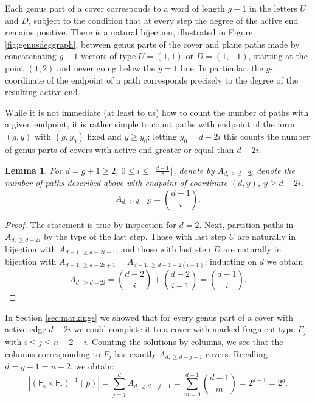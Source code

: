 \documentclass[11pt,reqno]{amsart}
\newtheorem{lemma}[theorem]{Lemma}
\theoremstyle{definition}
\newcommand{\Ft}{\mathsf{F_t}}
\newcommand{\Fs}{\mathsf{F_s}}
\begin{document}
Each genus part of a cover corresponds to a  word of length $g-1$ in the letters $U$ and $D$, subject to the condition that at every step the degree of the active end remains positive. There is a natural bijection, illustrated in Figure \ref{fig:genusdeggraph}, between genus parts of the cover and plane paths made by concatenating $g-1$ vectors of type $U = (1,1)$ or $D = (1,-1)$, starting at the point $(1,2)$ and never going below the $y=1$ line. In particular, the $y$-coordinate of the endpoint of a path corresponds precisely to the degree of the resulting active end.

While it is not immediate (at least to us) how to count the number of paths with a given endpoint, it is rather simple to count paths  with endpoint of the form $(g, y)$ with $(g,y_0)$ fixed and $y\geq y_0$; letting $y_0 = d-2i$ this counts the number of genus parts of covers with active end greater or equal than $d-2i$.


\begin{lemma} \label{lemma:deg active}
For $d = g+1 \geq 2$, $0\leq i\leq \lfloor\frac{d-1}{2}\rfloor$, denote by $A_{d, \geq d-2i}$ denote the number of paths described above with endpoint of coordinate $(d, y)$, $y\geq d-2i$. 
\begin{equation}
  A_{d,\geq d-2i}%
  = {{d-1}\choose{i}}.
\end{equation}
\end{lemma}
\begin{proof}
    The statement is true by inspection for $d=2$. Next, partition paths in $A_{d,\geq d-2i}$ by the type of the last step. Those with last step $U$ are naturally in bijection with $A_{d-1,\geq d-2i-1}$, and those with last step $D$ are naturally in bijection  with $A_{d-1,\geq d-2i+1} =A_{d-1,\geq d -1-2(i-1)} $; inducting on $d$ we obtain
    \begin{equation}
        A_{d,\geq d-2i} = {{d-2}\choose{i}}+{{d-2}\choose{i-1}} = {{d-1}\choose{i}}.
    \end{equation}
\end{proof}

In Section \ref{sec:markings} we showed that for every genus part of a cover with active edge $d-2i$ we could complete it to a cover with marked fragment type $F_j$ with $i\leq j\leq n-2-i$. Counting the solutions by columns, we see that the columns corresponding to $F_j$ has exactly $A_{d, \geq d-j-1}$ covers. Recalling $d = g+1 = n-2$, we obtain:
\begin{equation}
    |(\Fs\times \Ft)^{-1}(p)| = \sum_{j = 1}^{d} A_{d, \geq d-j-1} = \sum_{m = 0}^{d-1}{{d-1}\choose{m}} = 2^{d-1} = 2^g.
\end{equation}
\end{document}
